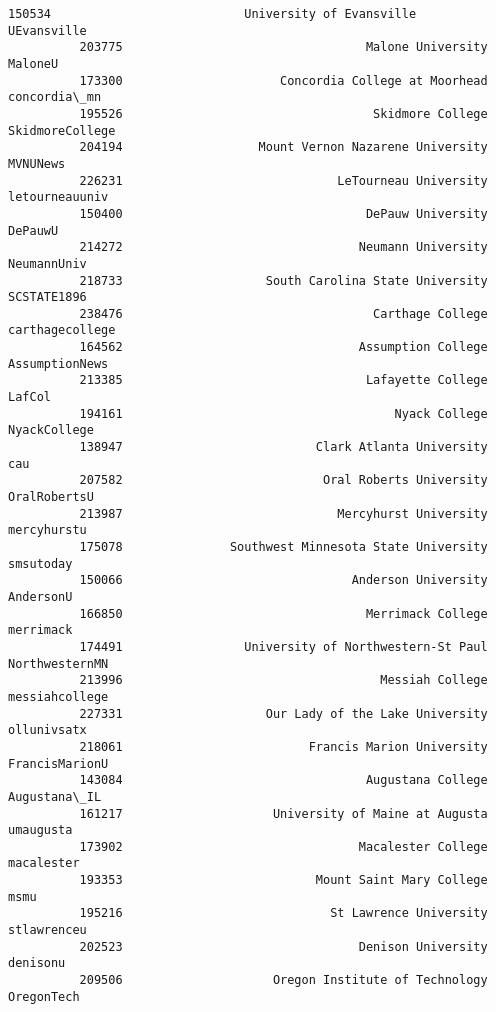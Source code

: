 \documentclass[11pt]{article}
\begin{document}
\begin{Verbatim}[commandchars=\\\{\}]
          150534                           University of Evansville      UEvansville   
          203775                                  Malone University          MaloneU   
          173300                      Concordia College at Moorhead     concordia\_mn   
          195526                                   Skidmore College  SkidmoreCollege   
          204194                   Mount Vernon Nazarene University         MVNUNews   
          226231                              LeTourneau University   letourneauuniv   
          150400                                  DePauw University          DePauwU   
          214272                                 Neumann University      NeumannUniv   
          218733                    South Carolina State University      SCSTATE1896   
          238476                                   Carthage College  carthagecollege   
          164562                                 Assumption College   AssumptionNews   
          213385                                  Lafayette College           LafCol   
          194161                                      Nyack College     NyackCollege   
          138947                           Clark Atlanta University              cau   
          207582                            Oral Roberts University     OralRobertsU   
          213987                              Mercyhurst University      mercyhurstu   
          175078               Southwest Minnesota State University        smsutoday   
          150066                                Anderson University        AndersonU   
          166850                                  Merrimack College        merrimack   
          174491                 University of Northwestern-St Paul   NorthwesternMN   
          213996                                    Messiah College   messiahcollege   
          227331                    Our Lady of the Lake University      ollunivsatx   
          218061                          Francis Marion University   FrancisMarionU   
          143084                                  Augustana College     Augustana\_IL   
          161217                     University of Maine at Augusta        umaugusta   
          173902                                 Macalester College       macalester   
          193353                           Mount Saint Mary College             msmu   
          195216                             St Lawrence University      stlawrenceu   
          202523                                 Denison University         denisonu   
          209506                     Oregon Institute of Technology       OregonTech   

\end{Verbatim}
\end{document}
